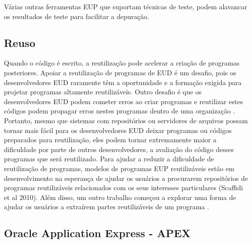 Várias outras ferramentas EUP que suportam técnicas de teste, podem alavancar os resultados de teste para facilitar a depuração.

\subsection{Reuso}

Quando o código é escrito, a reutilização pode acelerar a criação de programas posteriores. Apoiar a reutilização de programas de EUD é um desafio, pois os desenvolvedores EUD raramente têm a oportunidade e a formação exigida para projetar programas altamente reutilizáveis. Outro desafio é que os desenvolvedores EUD podem cometer erros ao criar programas e reutilizar estes códigos podem propagar erros nestes programas dentro de uma organização \cite{mackay1990patterns}. Portanto, mesmo que sistemas com repositórios ou servidores de arquivos possam tornar mais fácil para os desenvolvedores EUD deixar programas ou códigos preparados para reutilização, eles podem tornar extremamente maior a dificuldade por parte de outros desenvolvedores, a avaliação do código desses programas que será reutilizado. Para ajudar a reduzir a dificuldade de reutilização de programas, modelos de programas EUP reutilizáveis estão em desenvolvimento na esperança de ajudar os usuários a procurarem repositórios de programas reutilizáveis relacionados com os seus interesses particulares \cite{scaffidi2010using} (Scaffidi et al 2010). Além disso, um outro trabalho começou a explorar uma forma de ajudar os usuários a extraírem partes reutilizáveis de um programa \cite{oney2009firecrystal}.

\subsection{Oracle Application Express - APEX}

